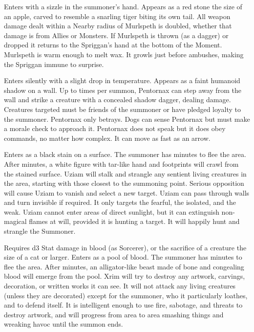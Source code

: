 {
Enters with a sizzle in the summoner's hand. Appears as a red stone the size of an apple, carved to resemble a snarling tiger biting its own tail. All weapon damage dealt within a Nearby radius of Murlspeth is doubled, whether that damage is from Allies or Monsters.  If Murlspeth is thrown (as a dagger) or dropped it returns to the Spriggan's hand at the bottom of the Moment. Murlspeth is warm enough to melt wax. It growls just before ambushes, making the Spriggan immune to surprise.


Enters silently with a slight drop in temperature. Appears as a faint humanoid shadow on a wall. Up to \DICE times per summon, Pentornax can step away from the wall and strike a creature with a concealed shadow dagger, dealing \SUMDICE damage. Creatures targeted must be friends of the summoner or have pledged loyalty to the summoner. Pentornax only betrays. Dogs can sense Pentornax but must make a morale check to approach it. Pentornax does not speak but it does obey commands, no matter how complex. It can move as fast as an arrow.


Enters as a black stain on a surface. The summoner has \SUMDICE minutes to flee the area. After \SUMDICE minutes, a white figure with tar-like hand and footprints will crawl from the stained surface. Uziam will stalk and strangle any sentient living creatures in the area, starting with those closest to the summoning point. Serious opposition will cause Uziam to vanish and select a new target. Uziam can pass through walls and turn invisible if required. It only targets the fearful, the isolated, and the weak. Uziam cannot enter areas of direct sunlight, but it can extinguish non-magical flames at will, provided it is hunting a target. It will happily hunt and strangle the Summoner.



Requires d3 Stat damage in blood (as Sorcerer), or the sacrifice of a creature the size of a cat or larger.  Enters as a pool of blood. The summoner has \SUMDICE minutes to flee the area. After \SUMDICE minutes, an alligator-like beast made of bone and congealing blood will emerge from the pool. Xrim will try to destroy any artwork, carvings, decoration, or written works it can see. It will not attack any living creatures (unless they are decorated) except for the summoner, who it particularly loathes, and to defend itself. It is intelligent enough to use fire, sabotage, and threats to destroy artwork, and will progress from area to area smashing things and wreaking havoc until the summon ends.



}
